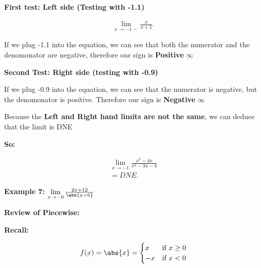 \documentclass{report}
\begin{document}
   \bigbreak \noindent 
   \textbf{First test: Left side (Testing with -1.1)}

   \begin{align*}
       \lim\limits_{x \to -1-}{ \frac{x}{x+1}}
   .\end{align*}

   \bigbreak \noindent 
   If we plug -1.1 into the equation, we can see that both the numerator and the denomonator are negative, 
   therefore our sign is \textbf{Positive} $\infty$

   \bigbreak \noindent 
   \textbf{Second Test: Right side (testing with -0.9)}
   
   \bigbreak \noindent 
   If we plug -0.9 into the equation, we can see that the numerator is negative, but the denomonator
   is positive. Therefore our sign is \textbf{Negative} $\infty$

   \bigbreak \noindent 
   Because the \textbf{Left and Right hand limits are not the same}, we can deduce that the limit is DNE

   \bigbreak \noindent 
   \textbf{So:}

   \begin{align*}
       \lim\limits_{x \to -1}{ \frac{x^2-4x}{x^2-3x-4}} \\
       = DNE
   .\end{align*}
   
   \bigbreak \noindent \bigbreak \noindent 
   \begin{large}
       \noindent \textbf{Example 7: $\lim\limits_{x \to -6}{ \frac{2x+12}{\abs{x+6}}}$} 
   \end{large}

   \bigbreak \noindent \textbf{} 
   
   \bigbreak \noindent \bigbreak \noindent 
   \begin{large}
      \textbf{Review of Piecewise:} 
   \end{large}

   \bigbreak \noindent \bigbreak \noindent 
   \textbf{Recall: }
  
   \bigbreak \noindent 
   \begin{equation}
    f(x)= \abs{x} =
        \begin{cases}
            x & \text{if } x \geq 0 \\ 
            -x & \text{if } x < 0 
        \end{cases}
    \end{equation}
\end{document}
